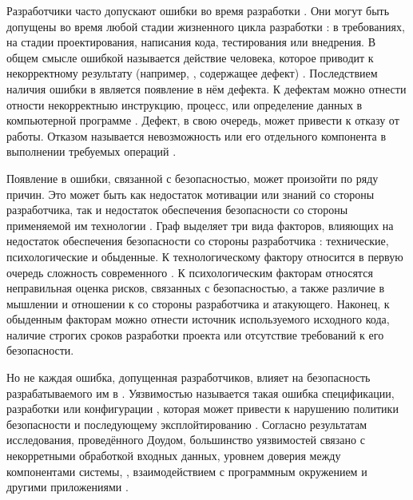 %
Разработчики часто допускают ошибки во время разработки . 
%
Они могут быть допущены во время любой стадии жизненного цикла разработки : в требованиях, на стадии проектирования, написания кода, тестирования или внедрения. 
%
В общем смысле ошибкой называется действие человека, которое приводит к некорректному результату (например, , содержащее дефект) . 
%
Последствием наличия ошибки в  является появление в нём дефекта. 
%
К дефектам можно отнести отности некорректныю инструкцию, процесс, или определение данных в компьютерной программе . 
%
Дефект, в свою очередь, может привести к отказу  от работы. 
%
Отказом называется невозможность  или его отдельного компонента в выполнении требуемых операций .

%
Появление в  ошибки, связанной с безопасностью, может произойти по ряду причин. 
%
Это может быть как недостаток мотивации или знаний со стороны разработчика, так и недостаток обеспечения безопасности со стороны применяемой им технологии . 
%
Граф выделяет три вида факторов, влияющих на недостаток обеспечения безопасности со стороны разработчика : технические, психологические и обыденные. 
%
К технологическому фактору относится в первую очередь сложность современного . 
%
К психологическим факторам относятся неправильная оценка рисков, связанных с безопасностью, а также различие в мышлении и отношении к  со стороны разработчика и атакующего. 
%
Наконец, к обыденным факторам можно отнести источник используемого исходного кода, наличие строгих сроков разработки проекта или отсутствие требований к его безопасности.

%
Но не каждая ошибка, допущенная разработчиков, влияет на безопасность разрабатываемого им в . 
%
Уязвимостью называется такая ошибка спецификации, разработки или конфигурации , которая может привести к нарушению политики безопасности и последующему эксплойтированию     .
%
Согласно результатам исследования, проведённого Доудом, большинство уязвимостей связано с некорретными обработкой входных данных, уровнем доверия между компонентами системы, , взаимодействием с программным окружением и другими приложениями . 

